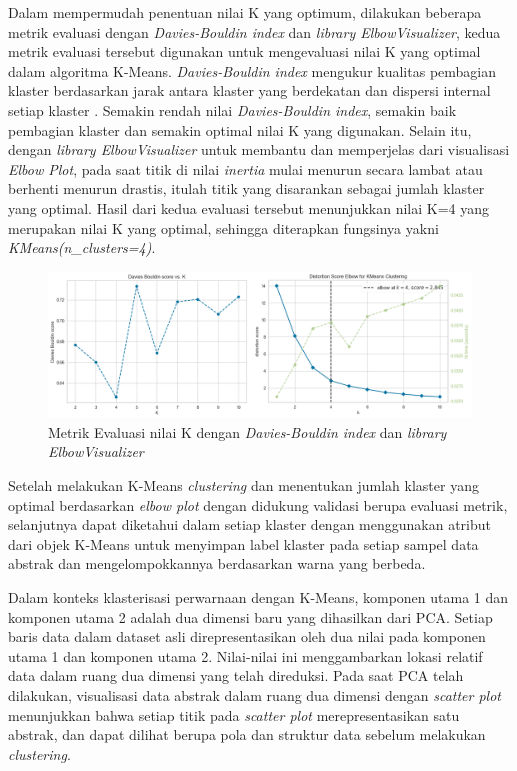 Dalam mempermudah penentuan nilai K yang optimum, dilakukan beberapa metrik evaluasi dengan \textit{Davies-Bouldin index} dan \textit{library ElbowVisualizer}, kedua metrik evaluasi tersebut digunakan untuk mengevaluasi nilai K yang optimal dalam algoritma K-Means. \textit{Davies-Bouldin index} mengukur kualitas pembagian klaster berdasarkan jarak antara klaster yang berdekatan dan dispersi internal setiap klaster \cite{sanghun2022}. Semakin rendah nilai \textit{Davies-Bouldin index}, semakin baik pembagian klaster dan semakin optimal nilai K yang digunakan. Selain itu, dengan \textit{library ElbowVisualizer} untuk membantu dan memperjelas dari visualisasi \textit{Elbow Plot}, pada saat titik di nilai \textit{inertia} mulai menurun secara lambat atau berhenti menurun drastis, itulah titik yang disarankan sebagai jumlah klaster yang optimal. Hasil dari kedua evaluasi tersebut menunjukkan nilai K=4 yang merupakan nilai K yang optimal, sehingga diterapkan fungsinya yakni \textit{KMeans(n\_clusters=4)}.

\begin{figure}[H]
    \centering
    \includegraphics[width=0.9\linewidth]{img/4-21-3.png}
    \caption{Metrik Evaluasi nilai K dengan \textit{Davies-Bouldin index} dan \textit{library ElbowVisualizer}}
    \label{fig:4-21-3}
\end{figure}

Setelah melakukan K-Means \textit{clustering} dan menentukan jumlah klaster yang optimal berdasarkan \textit{elbow plot} dengan didukung validasi berupa evaluasi metrik, selanjutnya dapat diketahui dalam setiap klaster dengan menggunakan atribut dari objek K-Means untuk menyimpan label klaster pada setiap sampel data abstrak dan mengelompokkannya berdasarkan warna yang berbeda. 

Dalam konteks klasterisasi perwarnaan dengan K-Means, komponen utama 1 dan komponen utama 2 adalah dua dimensi baru yang dihasilkan dari PCA. Setiap baris data dalam dataset asli direpresentasikan oleh dua nilai pada komponen utama 1 dan komponen utama 2. Nilai-nilai ini menggambarkan lokasi relatif data dalam ruang dua dimensi yang telah direduksi. Pada saat PCA telah dilakukan, visualisasi data abstrak dalam ruang dua dimensi dengan \textit{scatter plot} menunjukkan bahwa setiap titik pada \textit{scatter plot} merepresentasikan satu abstrak, dan dapat dilihat berupa pola dan struktur data sebelum melakukan \textit{clustering}. 

